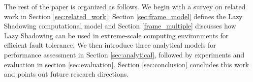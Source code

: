 The rest of the paper is organized as follows. We begin with a survey on related work in Section 
\ref{sec:related_work}. Section \ref{sec:frame_model} defines the Lazy Shadowing 
computational model and Section \ref{frame_multiple} discusses how Lazy Shadowing can be used in 
extreme-scale computing environments for efficient fault tolerance. 
We then introduce three analytical models for performance assessment
in Section \ref{sec:analytical}, 
followed by experiments and evaluation in
section \ref{sec:evaluation}. Section \ref{sec:conclusion} concludes this work and points out 
future research directions.





















